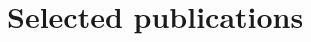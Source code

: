 \documentclass[a4paper,10pt]{article} %
\begin{document}
%
%
%
%
%
%
%
%
%


\section*{Selected publications}
\end{document}

